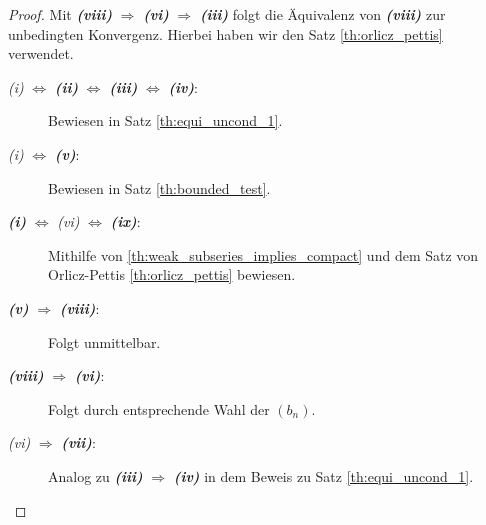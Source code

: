 \begin{proof}
	Mit \textbf{\textit{\itshape\textrm{(viii)}}} $ \Rightarrow $ \textbf{\textit{\textrm{(vi)}}} $ \Rightarrow $ \textbf{\textit{\textrm{(iii)}}} folgt die Äquivalenz von \textbf{\textit{\itshape\textrm{(viii)}}} zur unbedingten Konvergenz. Hierbei haben wir den Satz \ref{th:orlicz_pettis} verwendet.
	\begin{description}
		\item[\textit{ \itshape\textrm{(i)}} $ \Leftrightarrow $ \textbf{\textit{\textrm{(ii)}}} $ \Leftrightarrow $ \textbf{\textit{\textrm{(iii)}}} $ \Leftrightarrow $ \textbf{\textit{\textrm{(iv)}}}:]
		Bewiesen in Satz \ref{th:equi_uncond_1}.
		
		\item[\textit{ \itshape\textrm{(i)}} $ \Leftrightarrow $ \textbf{\textit{\textrm{(v)}}}:] Bewiesen in Satz \ref{th:bounded_test}.
		
		\item[\textbf{\textit{\textrm{(i)}}} $ \Leftrightarrow $ \textit{ \itshape\textrm{(vi)}} $ \Leftrightarrow $ \textbf{\textit{\textrm{(ix)}}}:]
		Mithilfe von \ref{th:weak_subseries_implies_compact} und dem Satz von Orlicz-Pettis \ref{th:orlicz_pettis} bewiesen.
		
		\item[\textbf{\textit{\itshape\textrm{(v)}}} $ \Rightarrow $  \textbf{\textit{\textrm{(viii)}}}:] Folgt unmittelbar.
		
		\item[\textbf{\textit{\itshape\textrm{(viii)}}} $ \Rightarrow $ \textbf{\textit{\textrm{(vi)}}}:]
		Folgt durch entsprechende Wahl der $ (b_n) $.
		
		\item[\textit{ \itshape\textrm{(vi)}} $ \Rightarrow $ \textbf{\textit{\textrm{(vii)}}}:]
		Analog zu \textbf{\itshape\textrm{(iii)}} $ \Rightarrow $ \textbf{\textit{\textrm{(iv)}}} in dem Beweis zu Satz \ref{th:equi_uncond_1}.
		

\end{description}
\end{proof}
